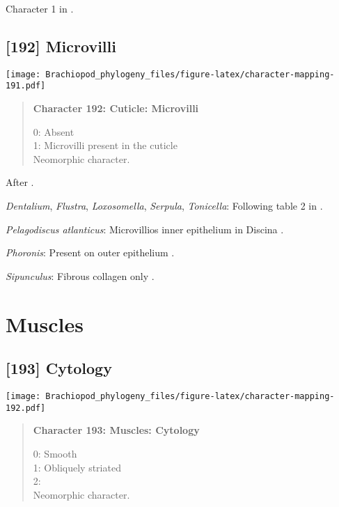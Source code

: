 \documentclass[openany]{book}
\theoremstyle{definition}
\theoremstyle{definition}
\theoremstyle{definition}
\theoremstyle{remark}
\begin{document}
Character 1 in \citet{Haszprunar2000}.

\subsection*{{[}192{]} Microvilli}\label{microvilli}

\texttt{[image: Brachiopod\_phylogeny\_files/figure-latex/character-mapping-191.pdf]}

\begin{quote}
\textbf{Character 192: Cuticle: Microvilli}

0: Absent\\
1: Microvilli present in the cuticle\\
Neomorphic character.
\end{quote}

After \citet{Borisanova2015}.

\hypertarget{Dentalium-coding-192}{}
\emph{Dentalium}, \emph{Flustra}, \emph{Loxosomella}, \emph{Serpula},
\emph{Tonicella}: Following table 2 in \citet{Borisanova2015}.

\hypertarget{Pelagodiscus_atlanticus-coding-192}{}
\emph{Pelagodiscus atlanticus}: Microvillios inner epithelium in Discina
\citep{Williams1997Introduction}.

\hypertarget{Phoronis-coding-192}{}
\emph{Phoronis}: Present on outer epithelium \citep{BereiterHahn1984}.

\hypertarget{Sipunculus-coding-192}{}
\emph{Sipunculus}: Fibrous collagen only \citep{BereiterHahn1984}.

\section{Muscles}\label{muscles}

\subsection*{{[}193{]} Cytology}\label{cytology}

\texttt{[image: Brachiopod\_phylogeny\_files/figure-latex/character-mapping-192.pdf]}

\begin{quote}
\textbf{Character 193: Muscles: Cytology}

0: Smooth\\
1: Obliquely striated\\
2:\\
Neomorphic character.
\end{quote}
\end{document}
